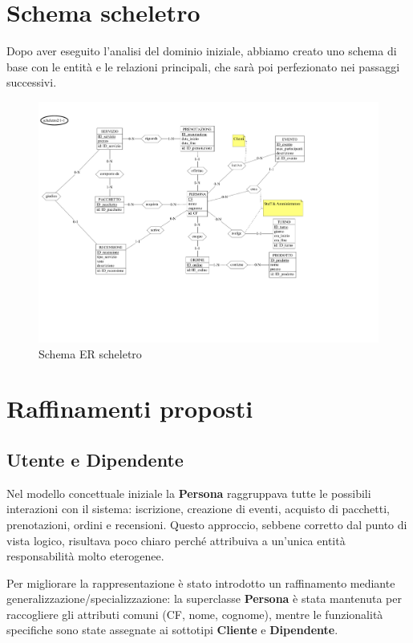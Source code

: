 \documentclass[a4paper,12pt]{report}
\begin{document}
\section{Schema scheletro}
Dopo aver eseguito l'analisi del dominio iniziale, abbiamo creato uno schema di base con le entità e le relazioni principali,
che sarà poi perfezionato nei passaggi successivi.
\begin{figure}[H]
	\centering
	\includegraphics[width=\textwidth, trim=0 100pt 150pt 0 , clip]{./pdf/scheletro.pdf}
	\caption{Schema ER scheletro}
	\label{fig:schema-scheletro}
\end{figure}

\section{Raffinamenti proposti}
\subsection{Utente e Dipendente}
Nel modello concettuale iniziale la \textbf{Persona} raggruppava tutte le possibili interazioni con il sistema: iscrizione, creazione
di eventi, acquisto di pacchetti, prenotazioni, ordini e recensioni. Questo approccio, sebbene corretto dal punto di vista logico, risultava poco chiaro
perché attribuiva a un'unica entità responsabilità molto eterogenee.

\vspace{\baselineskip}
Per migliorare la rappresentazione è stato introdotto un raffinamento mediante generalizzazione/specializzazione: la superclasse
\textbf{Persona} è stata mantenuta per raccogliere gli attributi comuni (CF, nome, cognome), mentre le funzionalità specifiche sono state assegnate
ai sottotipi \textbf{Cliente} e \textbf{Dipendente}.
\end{document}
